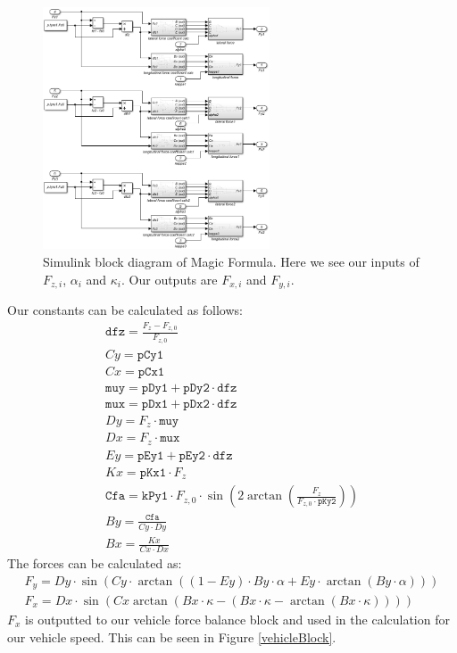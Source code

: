 \documentclass[11pt]{article}
\numberwithin{equation}{section}
\begin{document}
\begin{figure}[H]
    \centering
    \includegraphics[width = 0.6\textwidth]{./img/magicTyreCalcs.png}
    \caption{Simulink block diagram of Magic Formula. Here we see our inputs of $F_{z,i}$, $\alpha_i$ and $\kappa_i$. Our outputs are $F_{x,i}$ and $F_{y,i}$.}
\end{figure}
Our constants can be calculated as follows:
\begin{gather}
    \texttt{dfz} = \frac{F_z - F_{z,0}}{F_{z,0}}\\
    Cy = \texttt{pCy1}\\
    Cx = \texttt{pCx1}\\
    \texttt{muy} = \texttt{pDy1} + \texttt{pDy2} \cdot \texttt{dfz}\\
    \texttt{mux} = \texttt{pDx1} + \texttt{pDx2} \cdot \texttt{dfz}\\
    Dy = F_z \cdot \texttt{muy}\\
    Dx = F_z \cdot \texttt{mux}\\
    Ey = \texttt{pEy1} + \texttt{pEy2}\cdot \texttt{dfz}\\
    Kx = \texttt{pKx1}\cdot F_z\\
    \texttt{Cfa} = \texttt{kPy1}\cdot F_{z,0} \cdot \sin\left(2\arctan\left(\frac{F_z}{F_{z,0}\cdot \texttt{pKy2}}\right)\right)\\
    By = \frac{\texttt{Cfa}}{Cy \cdot Dy}\\
    Bx = \frac{Kx}{Cx \cdot Dx}
\end{gather}
The forces can be calculated as:
\begin{gather}
    F_y = Dy\cdot \sin\left(Cy \cdot \arctan\left(\left(1 - Ey\right)\cdot By \cdot \alpha + Ey \cdot \arctan\left(By\cdot \alpha\right)\right)\right)\\
    F_x = Dx \cdot \sin\left(Cx \arctan\left(Bx \cdot \kappa -\left(Bx \cdot \kappa - \arctan\left(Bx \cdot \kappa\right)\right)\right)\right)
\end{gather}
$F_x$ is outputted to our vehicle force balance block and used in the calculation for our vehicle speed. This can be seen in Figure \ref{vehicleBlock}.
\end{document}
